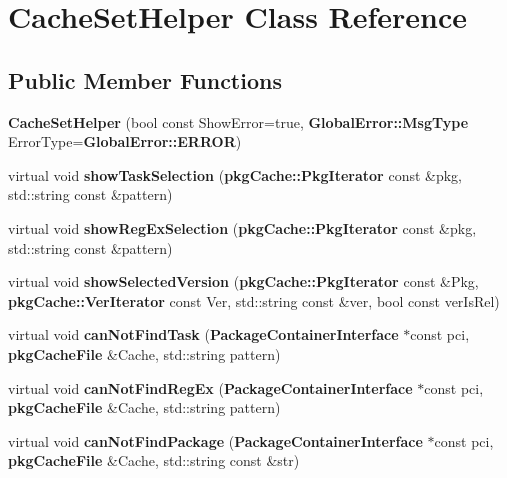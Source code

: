 \section{\-Cache\-Set\-Helper \-Class \-Reference}
\label{classAPT_1_1CacheSetHelper}
\subsection*{\-Public \-Member \-Functions}
\begin{DoxyCompactItemize}
\item 
{\bfseries \-Cache\-Set\-Helper} (bool const \-Show\-Error=true, {\bf \-Global\-Error\-::\-Msg\-Type} \-Error\-Type={\bf \-Global\-Error\-::\-E\-R\-R\-O\-R})\label{classAPT_1_1CacheSetHelper_ad9104132376837f10466a56b2df310be}

\item 
virtual void {\bfseries show\-Task\-Selection} ({\bf pkg\-Cache\-::\-Pkg\-Iterator} const \&pkg, std\-::string const \&pattern)\label{classAPT_1_1CacheSetHelper_a8526549a27e24f72c7ef03e629175862}

\item 
virtual void {\bfseries show\-Reg\-Ex\-Selection} ({\bf pkg\-Cache\-::\-Pkg\-Iterator} const \&pkg, std\-::string const \&pattern)\label{classAPT_1_1CacheSetHelper_a526e0225aa2674c8fb405fdc2be3e3f9}

\item 
virtual void {\bfseries show\-Selected\-Version} ({\bf pkg\-Cache\-::\-Pkg\-Iterator} const \&\-Pkg, {\bf pkg\-Cache\-::\-Ver\-Iterator} const \-Ver, std\-::string const \&ver, bool const ver\-Is\-Rel)\label{classAPT_1_1CacheSetHelper_aef92ec834773a43566f671e2e3912dd2}

\item 
virtual void {\bfseries can\-Not\-Find\-Task} ({\bf \-Package\-Container\-Interface} $\ast$const pci, {\bf pkg\-Cache\-File} \&\-Cache, std\-::string pattern)\label{classAPT_1_1CacheSetHelper_ad6e77e23e60c741a0667ad81b77f19ac}

\item 
virtual void {\bfseries can\-Not\-Find\-Reg\-Ex} ({\bf \-Package\-Container\-Interface} $\ast$const pci, {\bf pkg\-Cache\-File} \&\-Cache, std\-::string pattern)\label{classAPT_1_1CacheSetHelper_a437d8b499171c26f40484470a5491eb8}

\item 
virtual void {\bfseries can\-Not\-Find\-Package} ({\bf \-Package\-Container\-Interface} $\ast$const pci, {\bf pkg\-Cache\-File} \&\-Cache, std\-::string const \&str)\label{classAPT_1_1CacheSetHelper_acb46260b77e03d642087c6c4c0234927}


\end{DoxyCompactItemize}
